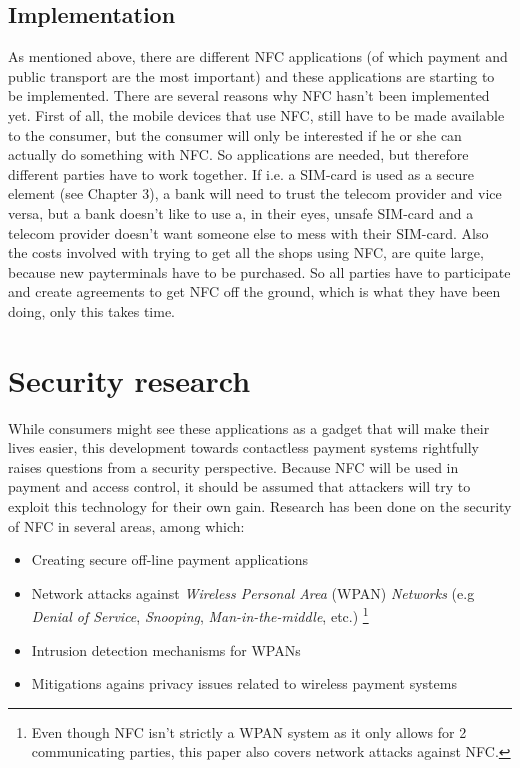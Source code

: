 \subsection{Implementation}
As mentioned above, there are different NFC applications (of which payment and public transport are the most important) and these applications are starting to be implemented. There are several reasons why NFC hasn't been implemented yet. First of all, the mobile devices that use NFC, still have to be made available to the consumer, but the consumer will only be interested if he or she can actually do something with NFC. So applications are needed, but therefore different parties have to work together. If i.e. a SIM-card is used as a secure element (see Chapter 3), a bank will need to trust the telecom provider and vice versa, but a bank doesn't like to use a, in their eyes, unsafe SIM-card and a telecom provider doesn't want someone else to mess with their SIM-card. Also the costs involved with trying to get all the shops using NFC, are quite large, because new payterminals have to be purchased.
So all parties have to participate and create agreements to get NFC off the ground, which is what they have been doing, only this takes time. %


\section{Security research}
While consumers might see these applications as a gadget that will make their lives easier, this development towards contactless payment systems rightfully raises questions from a security perspective.
Because NFC will be used in payment and access control, it should be assumed that attackers will try to exploit this technology for their own gain. 
Research has been done on the security of NFC in several areas, among which:

\begin{itemize}
\item Creating secure off-line payment applications \cite{1592613}
\item Network attacks against \textit{Wireless Personal Area} (WPAN) \textit{Networks} (e.g \textit{Denial of Service}, \textit{Snooping}, \textit{Man-in-the-middle}, etc.) \footnote{Even though NFC isn't strictly a WPAN system as it only allows for 2 communicating parties, this paper also covers network attacks against NFC.}  \cite{1506342}
\item Intrusion detection mechanisms for WPANs \cite{1361512}
\item Mitigations agains privacy issues related to wireless payment systems \cite{1527027}
\end{itemize}

